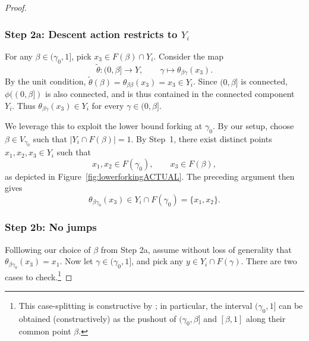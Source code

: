 \documentclass[a4paper, 11pt,reqno]{amsart}
\begin{document}
\begin{proof}
	
%	
	
	\subsubsection*{Step 2a: Descent action restricts to $Y_i$} For any $\beta\in(\gamma_0,1]$, pick $x_3\in F(\beta)\cap Y_i$. Consider the map
	\[
	\widetilde\theta\colon(0,\beta]\longrightarrow Y,
	\qquad
	\gamma\longmapsto\theta_{\beta\gamma}(x_3).
	\] 
	By the unit condition, $\widetilde\theta(\beta)=\theta_{\beta\beta}(x_3)=x_3\in Y_i$. Since $(0,\beta]$ is connected, $\phi((0,\beta])$ is also connected, and is thus contained in
	the connected component $Y_i$. Thus $\theta_{\beta\gamma}(x_3)\in Y_i$ for every $\gamma\in (0,\beta]$. 
	
	We leverage this to exploit the lower bound forking at $\gamma_0$. By our setup, choose $\beta\in V_{\gamma_0}$ such that
	$|Y_i\cap F(\beta)|=1$. By Step~1, there exist distinct points
	$x_1,x_2,x_3\in Y_i$ such that
$$	x_1,x_2\in F(\gamma_0),
\qquad
x_3\in F(\beta),$$
as depicted in Figure~\ref{fig:lowerforkingACTUAL}. The preceding argument then gives
\begin{equation}\label{eq:Step2a-forking}
	\theta_{\beta\gamma_0}(x_3)\in Y_i\cap F(\gamma_0)
=\{x_1,x_2\}.
\end{equation}
	
	
	\subsubsection*{Step 2b: No jumps} Folllowing our choice of $\beta$ from Step 2a, assume without loss of generality that $\theta_{\beta\gamma_0}(x_3)=x_1$. Now let $\gamma\in (\gamma_0,1]$, and pick any $y\in Y_i\cap F(\gamma)$. There are two cases to check.\footnote{This case-splitting is constructive by
		\cite[Proposition~1.37]{NV}; in particular, the interval $(\gamma_0,1]$ can be obtained
		(constructively) as the pushout of $(\gamma_0,\beta]$ and $[\beta,1]$
		along their common point $\beta$. %
	
}
\end{proof}
\end{document}
